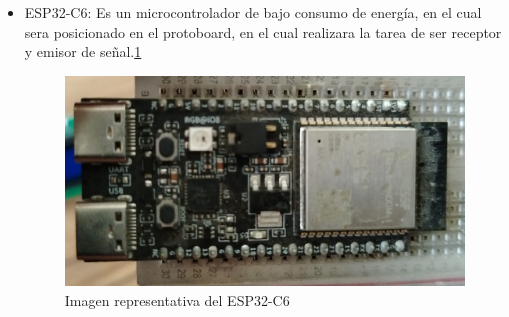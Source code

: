     \begin{itemize}
        \item ESP32-C6: Es un microcontrolador de bajo consumo de energía, en el cual sera posicionado en el protoboard, en el cual realizara la tarea de ser receptor y emisor de señal.\ref{fig:ESP32-C6}
    
          \begin{figure}[H]
            \centering
            \includegraphics[trim = {0mm 0mm 0mm 0mm},clip,scale=0.2]{12/Img/eSP32-C6.jpg}
            \caption{Imagen representativa del ESP32-C6}
            \label{fig:ESP32-C6}
        \end{figure}
        
    \end{itemize}
    
